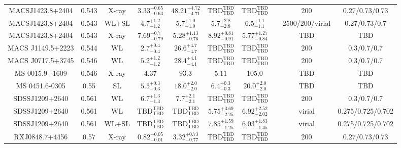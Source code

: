 \begin{table}
\begin{tabular}{cccccccccc}
MACSJ1423.8+2404 & 0.543 & X-ray & ${3.33}^{+0.65}_{-0.63}$ & ${48.21}^{+4.72}_{-4.71}$ & ${\mathrm{TBD}}^{\mathrm{TBD}}_{\mathrm{TBD}}$ & ${\mathrm{TBD}}^{\mathrm{TBD}}_{\mathrm{TBD}}$ & \citet{BA14.1} & 200 & 0.27/0.73/0.73 \\
MACSJ1423.8+2404 & 0.543 & WL+SL & ${4.7}^{+1.2}_{-1.2}$ & ${5.7}^{+1.0}_{-1.0}$ & ${5.7}^{+2.8}_{-2.8}$ & ${6.5}^{+1.1}_{-1.1}$ & \citet{ME14.1} & 2500/200/virial & 0.27/0.73/0.7 \\
MACSJ1423.8+2404 & 0.543 & X-ray & ${7.69}^{+0.7}_{-0.79}$ & ${5.28}^{+1.13}_{-0.76}$ & ${8.92}^{+0.81}_{-0.91}$ & ${5.77}^{+1.27}_{-0.84}$ & \citet{SC06.1} & TBD & TBD \\
MACS J1149.5+2223 & 0.544 & WL & ${2.7}^{+0.4}_{-0.4}$ & ${26.6}^{+4.7}_{-4.7}$ & ${\mathrm{TBD}}^{\mathrm{TBD}}_{\mathrm{TBD}}$ & ${\mathrm{TBD}}^{\mathrm{TBD}}_{\mathrm{TBD}}$ & \citet{SE14.1} & 200 & 0.3/0.7/0.7 \\
MACS J0717.5+3745 & 0.546 & WL & ${5.2}^{+1.2}_{-1.2}$ & ${28.4}^{+4.1}_{-4.1}$ & ${\mathrm{TBD}}^{\mathrm{TBD}}_{\mathrm{TBD}}$ & ${\mathrm{TBD}}^{\mathrm{TBD}}_{\mathrm{TBD}}$ & \citet{SE14.1} & 200 & 0.3/0.7/0.7 \\
MS 0015.9+1609 & 0.546 & X-ray & ${4.37}^{}_{}$ & ${93.3}^{}_{}$ & ${5.11}^{}_{}$ & ${105.0}^{}_{}$ & \citet{MO99.1} & TBD & TBD \\
MS 0451.6-0305 & 0.55 & SL & ${5.5}^{+0.3}_{-0.3}$ & ${18.0}^{+2.0}_{-2.0}$ & ${6.4}^{+0.3}_{-0.3}$ & ${20.0}^{+2.0}_{-2.0}$ & \citet{CO07.1} & TBD & TBD \\
SDSSJ1209+2640 & 0.561 & WL & ${6.7}^{+1.3}_{-1.3}$ & ${7.7}^{+2.1}_{-2.1}$ & ${\mathrm{TBD}}^{\mathrm{TBD}}_{\mathrm{TBD}}$ & ${\mathrm{TBD}}^{\mathrm{TBD}}_{\mathrm{TBD}}$ & \citet{SE14.1} & 200 & 0.3/0.7/0.7 \\
SDSSJ1209+2640 & 0.561 & WL & ${\mathrm{TBD}}^{\mathrm{TBD}}_{\mathrm{TBD}}$ & ${\mathrm{TBD}}^{\mathrm{TBD}}_{\mathrm{TBD}}$ & ${5.75}^{+3.69}_{-2.25}$ & ${6.92}^{+2.52}_{-2.02}$ & \citet{OG12.1} & virial & 0.275/0.725/0.702 \\
SDSSJ1209+2640 & 0.561 & WL+SL & ${\mathrm{TBD}}^{\mathrm{TBD}}_{\mathrm{TBD}}$ & ${\mathrm{TBD}}^{\mathrm{TBD}}_{\mathrm{TBD}}$ & ${7.85}^{+1.59}_{-1.25}$ & ${6.03}^{+1.83}_{-1.45}$ & \citet{OG12.1} & virial & 0.275/0.725/0.702 \\
RXJ0848.7+4456 & 0.57 & X-ray & ${0.82}^{+0.05}_{-0.01}$ & ${3.32}^{+0.73}_{-0.77}$ & ${\mathrm{TBD}}^{\mathrm{TBD}}_{\mathrm{TBD}}$ & ${\mathrm{TBD}}^{\mathrm{TBD}}_{\mathrm{TBD}}$ & \citet{BA14.1} & 200 & 0.27/0.73/0.73 \\

\end{tabular}
\end{table}

